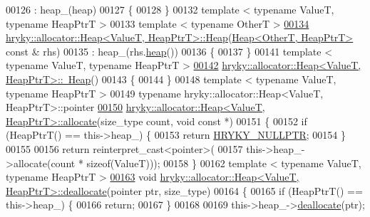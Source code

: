 \begin{DoxyCode}
00126     : heap\_(heap)
00127 \{
00128 \}
00132 \textcolor{keyword}{template} < \textcolor{keyword}{typename} ValueT, \textcolor{keyword}{typename} HeapPtrT >
00133 \textcolor{keyword}{template} < \textcolor{keyword}{typename} OtherT >
\hypertarget{allocator__heap_8h_source_l00134}{}\hyperlink{classhryky_1_1allocator_1_1_heap_a73751d2de2bd8ca6a88d7a3c5d2327dd}{00134} \hyperlink{classhryky_1_1allocator_1_1_heap}{hryky::allocator::Heap<ValueT, HeapPtrT>::Heap}(\hyperlink{classhryky_1_1allocator_1_1_heap}{Heap<OtherT, HeapPtrT>} \textcolor{keyword}{const} & 
      rhs)
00135     : heap\_(rhs.\hyperlink{namespacehryky_1_1memory_1_1global_a6fc6103f67c837aa0f39b359588409cd}{heap}())
00136 \{
00137 \}
00141 \textcolor{keyword}{template} < \textcolor{keyword}{typename} ValueT, \textcolor{keyword}{typename} HeapPtrT >
\hypertarget{allocator__heap_8h_source_l00142}{}\hyperlink{classhryky_1_1allocator_1_1_heap_a682f65aed73b63b9f7e86d6db413729d}{00142} \hyperlink{classhryky_1_1allocator_1_1_heap}{hryky::allocator::Heap<ValueT, HeapPtrT>::~Heap}()
00143 \{
00144 \}
00148 \textcolor{keyword}{template} < \textcolor{keyword}{typename} ValueT, \textcolor{keyword}{typename} HeapPtrT >
00149 \textcolor{keyword}{typename} hryky::allocator::Heap<ValueT, HeapPtrT>::pointer
\hypertarget{allocator__heap_8h_source_l00150}{}\hyperlink{classhryky_1_1allocator_1_1_heap_aa6049d5dcf3b2ec29cc6597d183e80bc}{00150} \hyperlink{classhryky_1_1allocator_1_1_heap}{hryky::allocator::Heap<ValueT, HeapPtrT>::allocate}(size\_type count, \textcolor{keywordtype}{void} \textcolor{keyword}{const} 
      *)
00151 \{
00152     \textcolor{keywordflow}{if} (HeapPtrT() == this->heap\_) \{
00153         \textcolor{keywordflow}{return} \hyperlink{common_8h_a4cd4ac09cfcdbd6b30ee69afc156e210}{HRYKY_NULLPTR};
00154     \}
00155 
00156     \textcolor{keywordflow}{return} \textcolor{keyword}{reinterpret\_cast<}pointer\textcolor{keyword}{>}(
00157         this->heap\_->allocate(count * \textcolor{keyword}{sizeof}(ValueT)));
00158 \}
00162 \textcolor{keyword}{template} < \textcolor{keyword}{typename} ValueT, \textcolor{keyword}{typename} HeapPtrT >
\hypertarget{allocator__heap_8h_source_l00163}{}\hyperlink{classhryky_1_1allocator_1_1_heap_a60545b7067de7bd142ada1b2ff5bf7f9}{00163} \textcolor{keywordtype}{void} \hyperlink{classhryky_1_1allocator_1_1_heap}{hryky::allocator::Heap<ValueT, HeapPtrT>::deallocate}(pointer ptr, 
      size\_type)
00164 \{
00165     \textcolor{keywordflow}{if} (HeapPtrT() == this->heap\_) \{
00166         \textcolor{keywordflow}{return};
00167     \}
00168 
00169     this->heap\_->\hyperlink{classhryky_1_1allocator_1_1_heap_a60545b7067de7bd142ada1b2ff5bf7f9}{deallocate}(ptr);

\end{DoxyCode}

